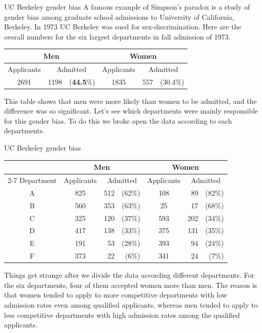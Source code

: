 \documentclass[serif,envcountsect,table,t]{beamer}%
\begin{document}
\begin{frame}{UC Berkeley gender bias}
A famous example of Simpson's
paradox is a study of gender bias among graduate school admissions to
University of California, Berkeley. In 1973 UC Berkeley was sued for
sex-discrimination. Here are the overall numbers for the six largest
departments in fall admission of 1973.

\begin{center}
  \begin{tabular}{crrcrr}\hline
    \multicolumn{3}{c}{Men} & \multicolumn{3}{c}{Women} \\\hline
    Applicants & \multicolumn{2}{c}{Admitted} & Applicants
                                      & \multicolumn{2}{c}{Admitted} \\\hline
    2691 & 1198 & ({\bf 44.5}\%) & 1835 & 557 & (30.4\%) \\\hline
  \end{tabular}
\end{center}
This table shows that men were more likely than women to be admitted,
and the difference was so significant. Let's see which departments
were mainly responsible for this gender bias. To do this we broke open
the data according to each departments.
\end{frame}
\begin{frame}{UC Berkeley gender bias}

\begin{center}
\begin{tabular}{ccrrcrr}\hline
  & \multicolumn{3}{c}{Men}  & \multicolumn{3}{c}{Women} \\\cline{2-7}
  Department & Applicants  & \multicolumn{2}{c}{Admitted} & Applicants
                           & \multicolumn{2}{c}{Admitted} \\\hline
A & 825 & 512& (62\%) & 108 & 89 &(82\%)  \\ 
B & 560 & 353& (63\%) & 25  & 17 &(68\%)  \\
C & 325 & 120& (37\%) & 593 & 202& (34\%) \\
D & 417 & 138& (33\%) & 375 & 131& (35\%) \\
E & 191 & 53 & (28\%) & 393 & 94 &(24\%)  \\
F & 373 & 22 & (6\%) & 341 & 24 &(7\%)  \\\hline
\end{tabular}
\end{center}

Things get strange after we divide the data according different
departments. For the six departments, four of them accepted women more
than men. The reason is that women
tended to apply to more competitive departments with low admission
rates even among qualified applicants, whereas men tended to apply to
less competitive departments with high admission rates among the
qualified applicants.
\end{frame}
\end{document}
